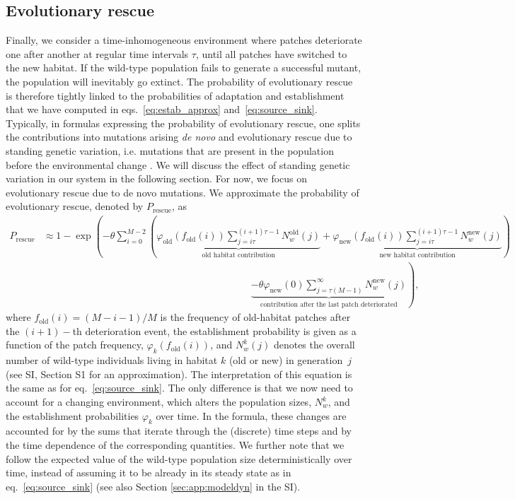 \documentclass[11pt]{article}
\newcommand{\chg}[1]{\textcolor{change}{#1}}
\begin{document}
\subsection*{Evolutionary rescue}
Finally, we consider a time-inhomogeneous environment where patches deteriorate one after \chg{another} at regular time intervals $\tau$, until all patches have switched to the new habitat. If the wild-type population fails to generate a successful mutant, the population will \chg{inevitably} go extinct. The probability of evolutionary rescue is therefore tightly linked to the probabilities of adaptation and establishment that we have computed in eqs.~\eqref{eq:estab_approx} and~\eqref{eq:source_sink}. Typically, in formulas expressing the probability of evolutionary rescue, one splits the contributions into mutations arising \textit{de novo} and evolutionary rescue due to standing genetic variation, i.e. mutations that are present in the population before the environmental change \citep{alexander_2014}. We will discuss the effect of standing genetic variation in our system in the following section. For now, we focus on evolutionary rescue due to de novo mutations. We approximate the probability of evolutionary rescue, denoted by $P_{\text{rescue}}$, as
\begin{equation}\label{eq:evol_rescue}
    \begin{aligned}
		P_{\text{rescue}} &\approx 1-\exp\left(- \theta \sum_{i=0}^{M-2} \left(\underbrace{\varphi_{\text{old}}\left(f_{\text{old}}(i)\right) \sum_{j=i\tau}^{(i+1)\tau -1} N_w^{\text{old}}(j)}_{\text{old habitat contribution}} + \underbrace{\varphi_{\text{new}}(f_{\text{old}}(i)) \sum_{j=i\tau}^{(i+1)\tau -1} N_w^{\text{new}}(j)}_{\text{new habitat contribution}}\right)\right.\\
		&\qquad\qquad \qquad\qquad\qquad\qquad\qquad \qquad \qquad \qquad\quad  \left.\underbrace{-\theta \varphi_{\text{new}}(0) \sum_{j = \tau (M-1) }^\infty  N_w^{\text{new}}(j)}_{\text{contribution after the last patch deteriorated}}\right),
	\end{aligned}
\end{equation}
where $f_{\text{old}}(i) = (M-i-1)/M$ is the frequency of old-habitat patches after the $(i+1)-$th deterioration event\chg{, the establishment probability is given as a function of the patch frequency, $\varphi_k(f_{\text{old}}(i))$,} and $N_w^{k}(j)$ denotes the overall number of wild-type individuals living in habitat $k$ (old or new) in generation~$j$ \chg{(see SI, Section S1 for an approximation)}. The interpretation of this equation is the same as for eq.~\eqref{eq:source_sink}. The only difference is that we now need to account for a changing environment, which alters the population sizes, $N_w^k$, and the establishment probabilities $\varphi_k$ \chg{over time}. In the formula, these changes are accounted for by the sums that iterate through the (discrete) time steps and by the time dependence of the corresponding quantities. We further note that we follow the \chg{expected value of} the wild-type population size deterministically over time, instead of assuming it to be already in its steady state as in eq.~\eqref{eq:source_sink} \chg{(see also Section \ref{sec:app:modeldyn} in the SI)}.
\end{document}
